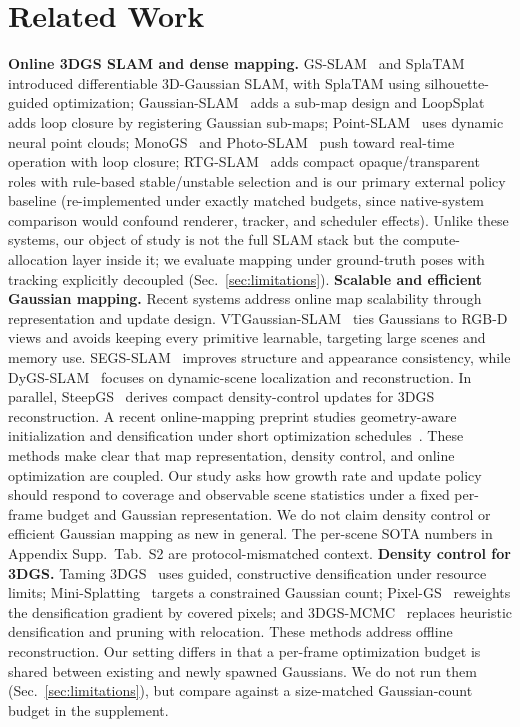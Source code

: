 \documentclass[10pt,twocolumn,letterpaper]{article}
\begin{document}
\section{Related Work}
\textbf{Online 3DGS SLAM and dense mapping.}
GS-SLAM~\cite{yan2024gsslam} and SplaTAM~\cite{keetha2023splatam} introduced differentiable 3D-Gaussian SLAM, with SplaTAM using silhouette-guided optimization; Gaussian-SLAM~\cite{yugay2023gaussianslam} adds a sub-map design and LoopSplat~\cite{zhu2025loopsplat} adds loop closure by registering Gaussian sub-maps; Point-SLAM~\cite{sandstrom2023pointslam} uses dynamic neural point clouds; MonoGS~\cite{matsuki2024gaussian} and Photo-SLAM~\cite{huang2024photoslam} push toward real-time operation with loop closure; RTG-SLAM~\cite{peng2024rtgslam} adds compact opaque/transparent roles with rule-based stable/unstable selection and is our primary external policy baseline (re-implemented under exactly matched budgets, since native-system comparison would confound renderer, tracker, and scheduler effects).
Unlike these systems, our object of study is not the full SLAM stack but the compute-allocation layer inside it; we evaluate mapping under ground-truth poses with tracking explicitly decoupled (Sec.~\ref{sec:limitations}).
\textbf{Scalable and efficient Gaussian mapping.}
Recent systems address online map scalability through representation and update design. VTGaussian-SLAM~\cite{hu2025vtgs} ties Gaussians to RGB-D views and avoids keeping every primitive learnable, targeting large scenes and memory use. SEGS-SLAM~\cite{wen2025segs} improves structure and appearance consistency, while DyGS-SLAM~\cite{hu2025dygs} focuses on dynamic-scene localization and reconstruction. In parallel, SteepGS~\cite{wang2025steepgs} derives compact density-control updates for 3DGS reconstruction. A recent online-mapping preprint studies geometry-aware initialization and densification under short optimization schedules~\cite{luu2026geometry}.
These methods make clear that map representation, density control, and online optimization are coupled. Our study asks how growth rate and update policy should respond to coverage and observable scene statistics under a fixed per-frame budget and Gaussian representation. We do not claim density control or efficient Gaussian mapping as new in general. The per-scene SOTA numbers in Appendix Supp.\ Tab.~S2 are protocol-mismatched context.
\textbf{Density control for 3DGS.}
Taming 3DGS~\cite{mallick2024taming} uses guided, constructive densification under resource limits; Mini-Splatting~\cite{fang2024minisplatting} targets a constrained Gaussian count; Pixel-GS~\cite{zhang2024pixelgs} reweights the densification gradient by covered pixels; and 3DGS-MCMC~\cite{kheradmand20243dgsmcmc} replaces heuristic densification and pruning with relocation. These methods address offline reconstruction. Our setting differs in that a per-frame optimization budget is shared between existing and newly spawned Gaussians. We do not run them (Sec.~\ref{sec:limitations}), but compare against a size-matched Gaussian-count budget in the supplement.
\end{document}
